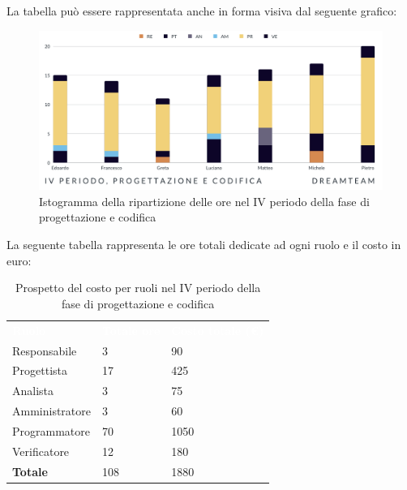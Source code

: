La tabella può essere rappresentata anche in forma visiva dal seguente grafico:
\begin{figure}[!h]
\centering
\includegraphics[scale=0.65]{Sezioni/SezioniPreventivo/grafici/Progettazione_codifica_IV_periodo.png}
\caption{Istogramma della ripartizione delle ore nel IV periodo della fase di progettazione e codifica}
\end{figure}

La seguente tabella rappresenta le ore totali dedicate ad ogni ruolo e il costo in euro:

\begin{table}[!htbp]
\begin{center}
\renewcommand{\arraystretch}{1.5}
\begin{tabular}{ m{}<{\centering}  m{}<{\centering} m{}<{\centering}}
	\rowcolor{darkblue}
	\textcolor{white}{\textbf{Ruolo}}&\textcolor{white}{\textbf{Totale ore}}&\textcolor{white}{\textbf{Costo totale (\euro)}}\\ 

	Responsabile  & 3 & 90 \\	
	
	Progettista & 17 & 425 \\
	
	Analista & 3 & 75 \\

	Amministratore & 3 & 60 \\
	
	Programmatore & 70 & 1050 \\
	
	Verificatore & 12 & 180 \\
	
	\textbf{Totale} & 108 & 1880\\
	
\end{tabular}
\caption{Prospetto del costo per ruoli nel IV periodo della fase di progettazione e codifica}
\end{center}
\end{table}

